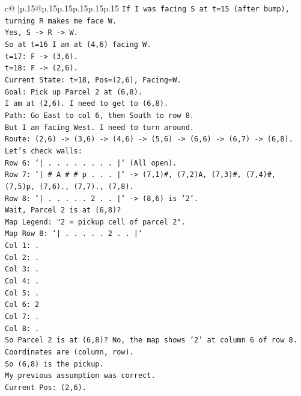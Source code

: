 \documentclass{article}
\begin{document}
{\begin{supertabular}{c@{$\;$}|p{.15\linewidth}@{}p{.15\linewidth}p{.15\linewidth}p{.15\linewidth}p{.15\linewidth}p{.15\linewidth}}
{{{\texttt{If I was facing S at t=15 (after bump), turning R makes me face W.} \\
\texttt{Yes, S {-}> R {-}> W.} \\
\texttt{So at t=16 I am at (4,6) facing W.} \\
\texttt{t=17: F {-}> (3,6).} \\
\texttt{t=18: F {-}> (2,6).} \\
\texttt{Current State: t=18, Pos=(2,6), Facing=W.} \\
\texttt{Goal: Pick up Parcel 2 at (6,8).} \\
\texttt{I am at (2,6). I need to get to (6,8).} \\
\texttt{Path: Go East to col 6, then South to row 8.} \\
\texttt{But I am facing West. I need to turn around.} \\
\texttt{Route: (2,6) {-}> (3,6) {-}> (4,6) {-}> (5,6) {-}> (6,6) {-}> (6,7) {-}> (6,8).} \\
\texttt{Let's check walls:} \\
\texttt{Row 6: `| . . . . . . . . |` (All open).} \\
\texttt{Row 7: `| \# A \# \# p . . . |` {-}> (7,1)\#, (7,2)A, (7,3)\#, (7,4)\#, (7,5)p, (7,6)., (7,7)., (7,8).} \\
\texttt{Row 8: `| . . . . . 2 . . |` {-}> (8,6) is '2'.} \\
\texttt{Wait, Parcel 2 is at (6,8)?} \\
\texttt{Map Legend: "2 = pickup cell of parcel 2".} \\
\texttt{Map Row 8: `| . . . . . 2 . . |`} \\
\texttt{Col 1: .} \\
\texttt{Col 2: .} \\
\texttt{Col 3: .} \\
\texttt{Col 4: .} \\
\texttt{Col 5: .} \\
\texttt{Col 6: 2} \\
\texttt{Col 7: .} \\
\texttt{Col 8: .} \\
\texttt{So Parcel 2 is at (6,8)? No, the map shows '2' at column 6 of row 8.} \\
\texttt{Coordinates are (column, row).} \\
\texttt{So (6,8) is the pickup.} \\
\texttt{My previous assumption was correct.} \\
\texttt{Current Pos: (2,6).} \\
}}}
\end{supertabular}}
\end{document}
